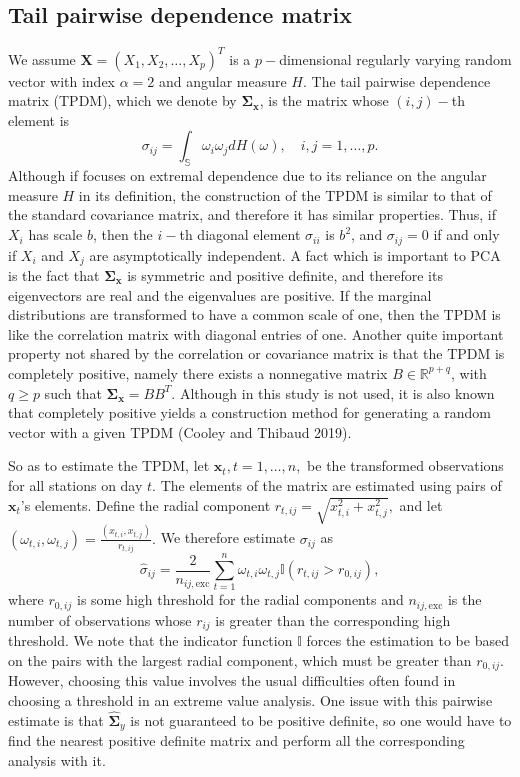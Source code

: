 \documentclass[11pt, oneside]{book}
\theoremstyle{plain}
\theoremstyle{remark}
\begin{document}
\subsection{Tail pairwise dependence matrix}
We assume $\mathbf{X} = (X_1,X_2,\dots,X_p)^T$ is a $p-$dimensional regularly
varying random vector with index $\alpha=2$ and angular measure $H$. The tail
pairwise dependence matrix (TPDM), which we denote by $\mathbf{\Sigma_x}$, is
the matrix whose $(i,j)-$th element is $$\sigma_{ij} =
\int_\mathbb{S}\omega_i\omega_jdH(\omega),\quad i,j=1,\dots,p.$$ Although if
focuses on extremal dependence due to its reliance on the angular measure $H$ in
its definition, the construction of the TPDM is similar to that of the standard
covariance matrix, and therefore it has similar properties. Thus, if $X_i$ has
scale $b$, then the $i-$th diagonal element $\sigma_{ii}$ is $b^2$, and
$\sigma_{ij}=0$ if and only if $X_i$ and $X_j$ are asymptotically independent. A
fact which is important to PCA is the fact that $\mathbf{\Sigma_x}$ is symmetric
and positive definite, and therefore its eigenvectors are real and the
eigenvalues are positive. If the marginal distributions are transformed to have
a common scale of one, then the TPDM is like the correlation matrix with
diagonal entries of one. Another quite important
property not shared by the correlation or covariance matrix is that the TPDM is
completely positive, namely there exists a nonnegative matrix
$B\in\mathbb{R}^{p+q}$, with $q\geq p$ such that $\mathbf{\Sigma_x} = BB^T$.
Although in this study is not used, it is also known that completely positive
yields a construction method for generating a random vector with a given TPDM
(Cooley and Thibaud 2019).

So as to estimate the TPDM, let $\mathbf{x}_t, t=1,\dots,n,$ be the
transformed observations for all stations on day $t$. The elements of the matrix
are estimated using pairs of $\mathbf{x}_t$'s elements. Define the radial
component $r_{t,ij} = \sqrt{x^2_{t,i} + x^2_{t,j}},$ and let
$(\omega_{t,i},\omega_{t,j}) = \frac{(x_{t,i}, x_{t,j})}{r_{t,ij}}.$ We
therefore estimate $\sigma_{ij}$ as 
\begin{equation}\label{eq:tpdm-estimate}
    \hat{\sigma}_{ij} = \frac{2}{n_{ij,\text{exc}}}\sum_{t=1}^{n}
    \omega_{t,i}\omega_{t,j}\mathbb{I}(r_{t,ij}>r_{0,ij}),
\end{equation} 
where $r_{0,ij}$ is some high threshold for the radial components and
$n_{ij,\text{exc}}$ is the number of observations whose $r_{ij}$ is greater than
the corresponding high threshold. We note that the indicator function
$\mathbb{I}$ forces the estimation to be based on the pairs with the largest
radial component, which must be greater than $r_{0,ij}$. However, choosing this
value involves the usual difficulties often found in choosing a threshold in an
extreme value analysis. One issue with this pairwise estimate is that
$\hat{\mathbf{\Sigma}}_y$ is not guaranteed to be positive definite, so one
would have to find the nearest positive definite matrix and perform all the
corresponding analysis with it. 
\end{document}
